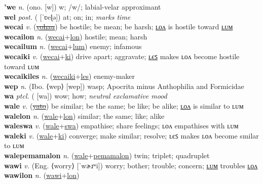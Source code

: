 \textbf{'we} \textit{n.} (ono. [w])
w; /w/; labial-velar approximant \label{'we} \\
\textbf{wel} \textit{post.} ( [ˈʋeɭə])
at; on; in; \textit{marks time} \label{wel} \\
\textbf{wecai} \textit{v.} (\hyperref[yohau]{\sout{yohau}})
be hostile; be mean; be harsh; \hyperref[wecailon]{ʟᴏᴧ} is hostile toward \hyperref[wecailum]{ʟᴜᴍ} \label{wecai} \\
\textbf{wecailon} \textit{n.} (\hyperref[wecai]{wecai}+\hyperref[lon]{lon})
hostile; mean; harsh \label{wecailon} \\
\textbf{wecailum} \textit{n.} (\hyperref[wecai]{wecai}+\hyperref[lum]{lum})
enemy; infamous \label{wecailum} \\
\textbf{wecaiki} \textit{v.} (\hyperref[wecai]{wecai}+\hyperref[ki]{ki})
drive apart; aggravate; \hyperref[wecaikiles]{ʟєꜱ} makes ʟᴏᴧ become hostile toward ʟᴜᴍ \label{wecaiki} \\
\textbf{wecaikiles} \textit{n.} (\hyperref[wecaiki]{wecaiki}+\hyperref[les]{les})
enemy-maker \label{wecaikiles} \\
\textbf{wep} \textit{n.} (Ibo. ⟨wep⟩ [wep])
wasp; Apocrita minus Anthophilia and Formicidae \label{wep} \\
\textbf{wa} \textit{ptcl.} ( [wa])
wow; how; \textit{neutral exclamative mood} \label{wa} \\
\textbf{wale} \textit{v.} (\hyperref[yato]{\sout{yato}})
be similar; be the same; be like; be alike; \hyperref[walelon]{ʟᴏᴧ} is similar to ʟᴜᴍ \label{wale} \\
\textbf{walelon} \textit{n.} (\hyperref[wale]{wale}+\hyperref[lon]{lon})
similar; the same; like; alike \label{walelon} \\
\textbf{waleswa} \textit{v.} (\hyperref[wale]{wale}+\hyperref[swa]{swa})
empathise; share feelings; ʟᴏᴧ empathises with ʟᴜᴍ \label{waleswa} \\
\textbf{waleki} \textit{v.} (\hyperref[wale]{wale}+\hyperref[ki]{ki})
converge; make similar; resolve; ʟєꜱ makes ʟᴏᴧ become smilar to ʟᴜᴍ \label{waleki} \\
\textbf{walepemamalon} \textit{n.} (\hyperref[wale]{wale}+\hyperref[pemamalon]{pemamalon})
twin; triplet; quadruplet \label{walepemamalon} \\
\textbf{wawi} \textit{v.} (Eng. ⟨worry⟩ [ˈwɚɹʷi])
worry; bother; trouble; concern; \hyperref[wawilum]{ʟᴜᴍ} troubles \hyperref[wawilon]{ʟᴏᴧ} \label{wawi} \\
\textbf{wawilon} \textit{n.} (\hyperref[wawi]{wawi}+\hyperref[lon]{lon})
